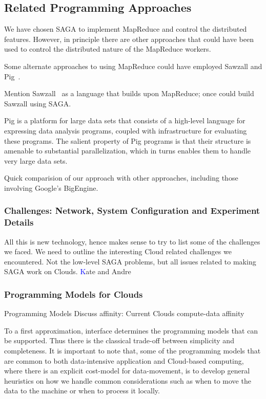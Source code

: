 \documentclass[conference,final]{IEEEtran}
\begin{document}
\subsection*{Related Programming Approaches}

We have chosen SAGA to implement MapReduce and control the distributed
features. However, in principle there are other approaches that could
have been used to control the distributed nature of the MapReduce
workers.

Some alternate approaches to using MapReduce could have employed
Sawzall and Pig~\cite{pig}.

Mention Sawzall~\cite{sawzall} as a language that builds upon
MapReduce; once could build Sawzall using SAGA.

Pig is a platform for large data sets that consists of a high-level
language for expressing data analysis programs, coupled with
infrastructure for evaluating these programs. The salient property of
Pig programs is that their structure is amenable to substantial
parallelization, which in turns enables them to handle very large data
sets.

Quick comparision of our approach with other approaches, including
those involving Google's BigEngine.


\subsubsection*{Challenges: Network, System Configuration and
  Experiment Details}

All this is new technology, hence makes sense to try to list some of
the challenges we faced. We need to outline the interesting Cloud
related challenges we encountered.  Not the low-level SAGA problems,
but all issues related to making SAGA work on Clouds.
{\textcolor{blue} Kate and Andre}

\subsubsection*{Programming Models for Clouds}

  Programming Models Discuss affinity: Current Clouds
  compute-data affinity


To a first approximation, interface determines the programming models
that can be supported. Thus there is the classical trade-off between
simplicity and completeness.  It is important to note that, some of
the programming models that are common to both data-intensive
application and Cloud-based computing, where there is an explicit
cost-model for data-movement, is to develop general heuristics on how
we handle common considerations such as when to move the data to the
machine or when to process it locally.
\end{document}
